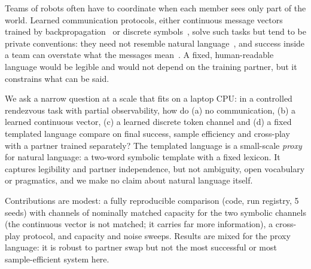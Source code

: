 Teams of robots often have to coordinate when each member sees only part of the world. Learned communication protocols, either continuous message vectors trained by backpropagation~\cite{sukhbaatar2016learning,foerster2016learning,das2018tarmac} or discrete symbols~\cite{lazaridou2016multi,havrylov2017emergence,mordatch2017emergence}, solve such tasks but tend to be private conventions: they need not resemble natural language~\cite{kottur2017natural}, and success inside a team can overstate what the messages mean~\cite{lowe2019pitfalls}. A fixed, human-readable language would be legible and would not depend on the training partner, but it constrains what can be said.

We ask a narrow question at a scale that fits on a laptop CPU: in a controlled rendezvous task with partial observability, how do (a) no communication, (b) a learned continuous vector, (c) a learned discrete token channel and (d) a fixed templated language compare on final success, sample efficiency and cross-play with a partner trained separately? The templated language is a small-scale \emph{proxy} for natural language: a two-word symbolic template with a fixed lexicon. It captures legibility and partner independence, but not ambiguity, open vocabulary or pragmatics, and we make no claim about natural language itself.

Contributions are modest: a fully reproducible comparison (code, run registry, 5 seeds) with channels of nominally matched capacity for the two symbolic channels (the continuous vector is not matched; it carries far more information), a cross-play protocol, and capacity and noise sweeps. Results are mixed for the proxy language: it is robust to partner swap but not the most successful or most sample-efficient system here.
